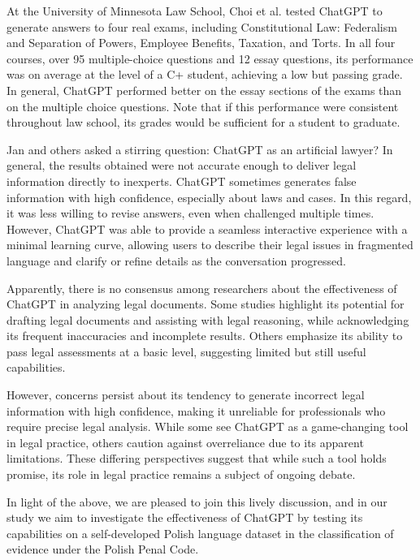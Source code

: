 \documentclass[preprint,12pt,number]{elsarticle}
\begin{document}
At the University of Minnesota Law School, Choi et al. \cite{choi2021chatgpt} tested ChatGPT to generate answers to four real exams, including Constitutional Law: Federalism and Separation of Powers, Employee Benefits, Taxation, and Torts. In all four courses, over 95 multiple-choice questions and 12 essay questions, its performance was on average at the level of a C+ student, achieving a low but passing grade. In general, ChatGPT performed better on the essay sections of the exams than on the multiple choice questions. Note that if this performance were consistent throughout law school, its grades would be sufficient for a student to graduate.

Jan and others \cite{tan2023chatgpt} asked a stirring question: ChatGPT as an artificial lawyer? In general, the results obtained were not accurate enough to deliver legal information directly to inexperts. ChatGPT sometimes generates false information with high confidence, especially about laws and cases. In this regard, it was less willing to revise answers, even when challenged multiple times. However, ChatGPT was able to provide a seamless interactive experience with a minimal learning curve, allowing users to describe their legal issues in fragmented language and clarify or refine details as the conversation progressed. 

Apparently, there is no consensus among researchers about the effectiveness of ChatGPT in analyzing legal documents. Some studies highlight its potential for drafting legal documents and assisting with legal reasoning, while acknowledging its frequent inaccuracies and incomplete results. Others emphasize its ability to pass legal assessments at a basic level, suggesting limited but still useful capabilities. 

However, concerns persist about its tendency to generate incorrect legal information with high confidence, making it unreliable for professionals who require precise legal analysis. While some see ChatGPT as a game-changing tool in legal practice, others caution against overreliance due to its apparent limitations. These differing perspectives suggest that while such a tool holds promise, its role in legal practice remains a subject of ongoing debate.

In light of the above, we are pleased to join this lively discussion, and in our study we aim to investigate the effectiveness of ChatGPT by testing its capabilities on a self-developed Polish language dataset in the classification of evidence under the Polish Penal Code.
\end{document}
